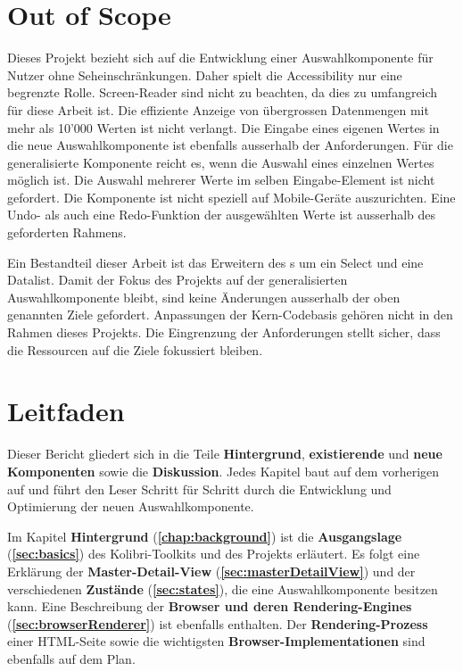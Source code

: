 \section{Out of Scope}
\label{sec:outOfScope}

Dieses Projekt bezieht sich auf die Entwicklung einer Auswahlkomponente für Nutzer ohne Seheinschränkungen. 
Daher spielt die Accessibility nur eine begrenzte Rolle. 
Screen-Reader sind nicht zu beachten, da dies zu umfangreich für diese Arbeit ist. 
Die effiziente Anzeige von übergrossen Datenmengen mit mehr als 10'000 Werten ist nicht verlangt. 
Die Eingabe eines eigenen Wertes in die neue Auswahlkomponente ist ebenfalls ausserhalb der Anforderungen. 
Für die generalisierte Komponente reicht es, wenn die Auswahl eines einzelnen Wertes möglich ist. 
Die Auswahl mehrerer Werte im selben Eingabe-Element ist nicht gefordert. 
Die Komponente ist nicht speziell auf Mobile-Geräte auszurichten. 
Eine Undo- als auch eine Redo-Funktion der ausgewählten Werte ist ausserhalb des geforderten Rahmens. 

Ein Bestandteil dieser Arbeit ist das Erweitern des s um ein Select und eine Datalist. 
Damit der Fokus des Projekts auf der generalisierten Auswahlkomponente bleibt, sind keine Änderungen ausserhalb der oben genannten Ziele gefordert. 
Anpassungen der Kern-Codebasis gehören nicht in den Rahmen dieses Projekts. 
Die Eingrenzung der Anforderungen stellt sicher, dass die Ressourcen auf die Ziele fokussiert bleiben. 


\section{Leitfaden}
\label{sec:tocTexted}

Dieser Bericht gliedert sich in die Teile \textbf{Hintergrund}, \textbf{existierende} und \textbf{neue Komponenten} sowie die \textbf{Diskussion}. 
Jedes Kapitel baut auf dem vorherigen auf und führt den Leser Schritt für Schritt durch die Entwicklung und Optimierung der neuen Auswahlkomponente. 

Im Kapitel \textbf{Hintergrund} (\textbf{\ref{chap:background}}) ist die \textbf{Ausgangslage} (\textbf{\ref{sec:basics}}) des Kolibri-Toolkits und des Projekts erläutert. 
Es folgt eine Erklärung der \textbf{Master-Detail-View} (\textbf{\ref{sec:masterDetailView}}) und der verschiedenen \textbf{Zustände} (\textbf{\ref{sec:states}}), die eine Auswahlkomponente besitzen kann. 
Eine Beschreibung der \textbf{Browser und deren Rendering-Engines} (\textbf{\ref{sec:browserRenderer}}) ist ebenfalls enthalten. 
Der \textbf{Rendering-Prozess} einer HTML-Seite sowie die wichtigsten \textbf{Browser-Implementationen} sind ebenfalls auf dem Plan. 

